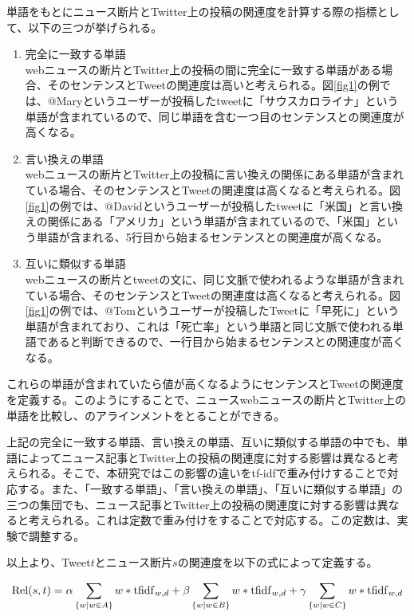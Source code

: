 \documentclass[12pt]{jarticle}
\begin{document}
単語をもとにニュース断片とTwitter上の投稿の関連度を計算する際の指標として、以下の三つが挙げられる。

\begin{enumerate}
 \item 完全に一致する単語\\
    webニュースの断片とTwitter上の投稿の間に完全に一致する単語がある場合、そのセンテンスとTweetの関連度は高いと考えられる。図\ref{fig1}の例では、@Maryというユーザーが投稿したtweetに「サウスカロライナ」という単語が含まれているので、同じ単語を含む一つ目のセンテンスとの関連度が高くなる。
 \item 言い換えの単語\\
    webニュースの断片とTwitter上の投稿に言い換えの関係にある単語が含まれている場合、そのセンテンスとTweetの関連度は高くなると考えられる。図\ref{fig1}の例では、@Davidというユーザーが投稿したtweetに「米国」と言い換えの関係にある「アメリカ」という単語が含まれているので、「米国」という単語が含まれる、5行目から始まるセンテンスとの関連度が高くなる。
 \item 互いに類似する単語\\
    webニュースの断片とtweetの文に、同じ文脈で使われるような単語が含まれている場合、そのセンテンスとTweetの関連度は高くなると考えられる。図\ref{fig1}の例では、@Tomというユーザーが投稿したTweetに「早死に」という単語が含まれており、これは「死亡率」という単語と同じ文脈で使われる単語であると判断できるので、一行目から始まるセンテンスとの関連度が高くなる。
\end{enumerate}

これらの単語が含まれていたら値が高くなるようにセンテンスとTweetの関連度を定義する。このようにすることで、ニュースwebニュースの断片とTwitter上の単語を比較し、のアラインメントをとることができる。

上記の完全に一致する単語、言い換えの単語、互いに類似する単語の中でも、単語によってニュース記事とTwitter上の投稿の関連度に対する影響は異なると考えられる。そこで、本研究ではこの影響の違いをtf-idfで重み付けすることで対応する。また、「一致する単語」、「言い換えの単語」、「互いに類似する単語」の三つの集団でも、ニュース記事とTwitter上の投稿の関連度に対する影響は異なると考えられる。これは定数で重み付けをすることで対応する。この定数は、実験で調整する。

以上より、Tweet$t$とニュース断片$s$の関連度を以下の式によって定義する。

\begin{equation}
  {\rm Rel}(s, t) = \alpha \sum_{\{w|w \in A\}} w * {\rm tfidf}_{w, d} +
                    \beta  \sum_{\{w|w \in B\}} w * {\rm tfidf}_{w, d} +
                    \gamma \sum_{\{w|w \in C\}} w * {\rm tfidf}_{w, d}
  \label{eq:rel}
\end{equation}
\end{document}
